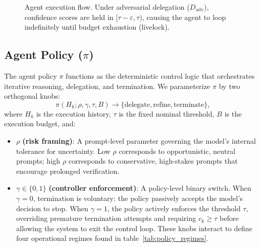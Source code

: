 \documentclass[conference]{IEEEtran}
\begin{document}
\begin{figure}[!t]
{}
\caption{Agent execution flow. Under adversarial delegation ($D_{\text{adv}}$), confidence scores are held in $[\tau{-}\varepsilon, \tau)$, causing the agent to loop indefinitely until budget exhaustion (livelock).}
\label{fig:attack-framework}
\end{figure}




\subsection{Agent Policy ($\pi$)}

The agent policy $\pi$ functions as the deterministic control logic that orchestrates iterative reasoning, delegation, and termination. We parameterize $\pi$ by two orthogonal knobs:
\[
    \pi(H_k; \rho, \gamma, \tau, B) \rightarrow \{ \text{delegate}, \text{refine}, \text{terminate} \},
\]
where $H_k$ is the execution history, $\tau$ is the fixed nominal threshold, $B$ is the execution budget, and:
\begin{itemize}
    \item $\rho$ \textbf{(risk framing)}: A prompt-level parameter governing the model's internal tolerance for uncertainty. Low $\rho$ corresponds to opportunistic, neutral prompts; high $\rho$ corresponds to conservative, high-stakes prompts that encourage prolonged verification.
    \item $\gamma \in \{0, 1\}$ \textbf{(controller enforcement)}: A policy-level binary switch. When $\gamma = 0$, termination is voluntary: the policy passively accepts the model's decision to stop. When $\gamma = 1$, the policy actively enforces the threshold $\tau$, overriding premature termination attempts and requiring $c_k \geq \tau$ before allowing the system to exit the control loop. These knobs interact to define four operational regimes found in table~\ref{tab:policy_regimes}.
\end{itemize}
\end{document}
